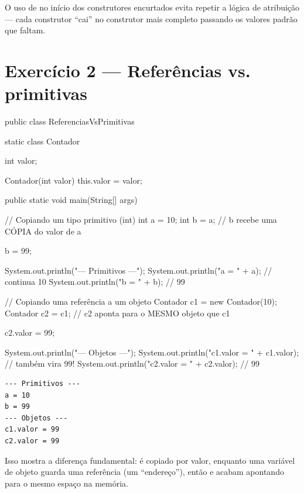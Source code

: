 \documentclass[11pt,a4paper]{article}
\begin{document}
\begin{destaque}
O uso de  no início dos construtores encurtados evita repetir a lógica de atribuição --- cada construtor ``cai'' no construtor mais completo passando os valores padrão que faltam.
\end{destaque}

\section{Exercício 2 --- Referências vs. primitivas}

\begin{javacode}
public class ReferenciasVsPrimitivas {

    static class Contador {
        int valor;

        Contador(int valor) {
            this.valor = valor;
        }
    }

    public static void main(String[] args) {
        // Copiando um tipo primitivo (int)
        int a = 10;
        int b = a; // b recebe uma CÓPIA do valor de a

        b = 99;

        System.out.println("--- Primitivos ---");
        System.out.println("a = " + a); // continua 10
        System.out.println("b = " + b); // 99

        // Copiando uma referência a um objeto
        Contador c1 = new Contador(10);
        Contador c2 = c1; // c2 aponta para o MESMO objeto que c1

        c2.valor = 99;

        System.out.println("--- Objetos ---");
        System.out.println("c1.valor = " + c1.valor); // também vira 99!
        System.out.println("c2.valor = " + c2.valor); // 99
    }
}
\end{javacode}

\begin{destaque}[Saída]
\begin{verbatim}
--- Primitivos ---
a = 10
b = 99
--- Objetos ---
c1.valor = 99
c2.valor = 99
\end{verbatim}
\end{destaque}

Isso mostra a diferença fundamental:  é copiado por valor, enquanto uma variável de objeto guarda uma referência (um ``endereço''), então  e  acabam apontando para o mesmo espaço na memória.
\end{document}
